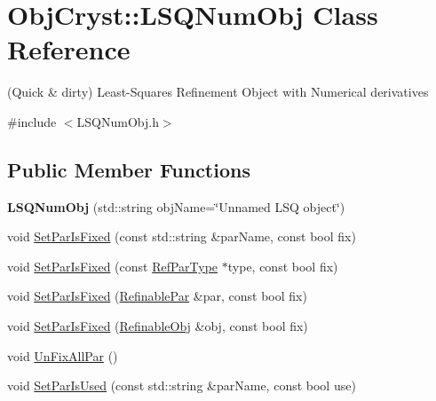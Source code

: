 \hypertarget{class_obj_cryst_1_1_l_s_q_num_obj}{}\section{Obj\+Cryst\+::L\+S\+Q\+Num\+Obj Class Reference}
\label{class_obj_cryst_1_1_l_s_q_num_obj}


(Quick \& dirty) Least-\/\+Squares Refinement Object with Numerical derivatives  




{\ttfamily \#include $<$L\+S\+Q\+Num\+Obj.\+h$>$}

\subsection*{Public Member Functions}
\begin{DoxyCompactItemize}
\item 
\mbox{\label{class_obj_cryst_1_1_l_s_q_num_obj_a2ccb9fe18f1324eef38c6d24740bdf9b}} 
{\bfseries L\+S\+Q\+Num\+Obj} (std\+::string obj\+Name=\char`\"{}Unnamed L\+SQ object\char`\"{})
\item 
void \mbox{\hyperlink{class_obj_cryst_1_1_l_s_q_num_obj_a0bc210b1f4e4b7099493d71c1a7c084d}{Set\+Par\+Is\+Fixed}} (const std\+::string \&par\+Name, const bool fix)
\item 
void \mbox{\hyperlink{class_obj_cryst_1_1_l_s_q_num_obj_a1be81668c496a3232e4b8416a3414bf3}{Set\+Par\+Is\+Fixed}} (const \mbox{\hyperlink{class_obj_cryst_1_1_ref_par_type}{Ref\+Par\+Type}} $\ast$type, const bool fix)
\item 
void \mbox{\hyperlink{class_obj_cryst_1_1_l_s_q_num_obj_ad240667179e473c6c16e8928893dfdf8}{Set\+Par\+Is\+Fixed}} (\mbox{\hyperlink{class_obj_cryst_1_1_refinable_par}{Refinable\+Par}} \&par, const bool fix)
\item 
void \mbox{\hyperlink{class_obj_cryst_1_1_l_s_q_num_obj_a6fdf2b9d64a527b0c2e81f92fd9be2c3}{Set\+Par\+Is\+Fixed}} (\mbox{\hyperlink{class_obj_cryst_1_1_refinable_obj}{Refinable\+Obj}} \&obj, const bool fix)
\item 
void \mbox{\hyperlink{class_obj_cryst_1_1_l_s_q_num_obj_ad7a98f0a5a88f61ec49ba66f558fe567}{Un\+Fix\+All\+Par}} ()
\item 
void \mbox{\hyperlink{class_obj_cryst_1_1_l_s_q_num_obj_ab4da8ad96c83cb850145c028e0acb1a7}{Set\+Par\+Is\+Used}} (const std\+::string \&par\+Name, const bool use)
\item 

\end{DoxyCompactItemize}
